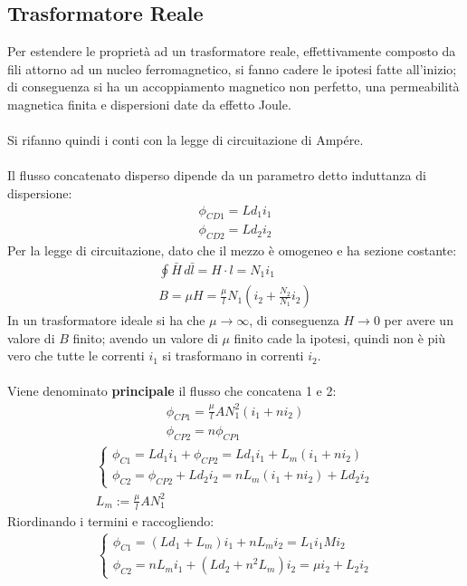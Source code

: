 \documentclass[../main.tex]{subfiles}
\begin{document}
	\subsection{Trasformatore Reale}
	Per estendere le proprietà ad un trasformatore reale, effettivamente composto da fili attorno ad un nucleo ferromagnetico, si fanno cadere le ipotesi fatte all'inizio; di conseguenza si ha un accoppiamento magnetico non perfetto, una permeabilità magnetica finita e dispersioni date da effetto Joule.\\\\
	Si rifanno quindi i conti con la legge di circuitazione di Ampére.\\\\
	Il flusso concatenato disperso dipende da un parametro detto induttanza di dispersione:
	\begin{gather}
		\phi _{CD1}=Ld_1i_1 \\
		\phi _{CD2}=Ld_2 i_2
	\end{gather}
	Per la legge di circuitazione, dato che il mezzo è omogeneo e ha sezione costante:
	\begin{gather}
		\oint  \bar H\, d\bar l = H\cdot l = N_1i_1 \\
		B=\mu H = \frac{\mu}{l}N_1 \left(i_2+\frac{N_2}{N_1}i_2\right)
	\end{gather}
	In un trasformatore ideale si ha che $\mu\rightarrow \infty$, di conseguenza $H\rightarrow 0$ per avere un valore di $B$ finito; avendo un valore di $\mu$ finito cade la ipotesi, quindi non è più vero che tutte le correnti $i_1$ si trasformano in correnti $i_2$.\\\\
	Viene denominato \textbf{principale} il flusso che concatena 1 e 2:
	\begin{gather}
		\phi _{CP1} = \frac{\mu}{l}AN_1^2(i_1+ni_2) \\
		\phi _{CP2} = n\phi_{CP1}
	\end{gather}
	\begin{gather}
		\begin{cases}
			\phi_{C1}=Ld_1i_1+\phi _{CP2} = Ld_1i_1 + L_m(i_1+ni_2) \\
			\phi_{C2}=\phi_{CP2}+Ld_2i_2=nL_m(i_1+ni_2)+Ld_2i_2
		\end{cases} \\
		L_m:=\frac{\mu}{l}AN_1^2
	\end{gather}
	Riordinando i termini e raccogliendo:
	\begin{gather}
		\begin{cases}
			\phi_{C1}=(Ld_1+L_m)i_1+nL_mi_2=L_1i_1Mi_2 \\
			\phi_{C2}=nL_mi_1+(Ld_2+n^2L_m)i_2=\mu i_2+L_2i_2
		\end{cases}
	\end{gather}
\end{document}
